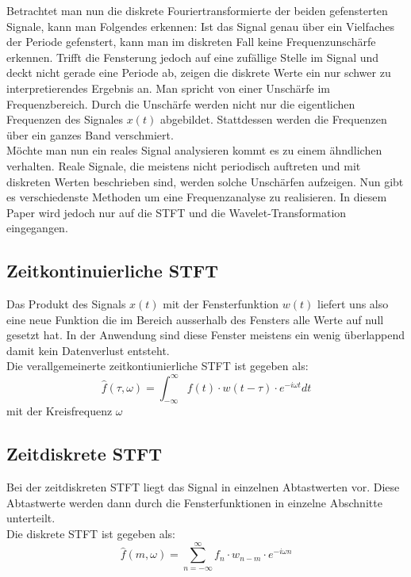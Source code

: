 Betrachtet man nun die diskrete Fouriertransformierte der beiden gefensterten Signale, kann man Folgendes erkennen: Ist das Signal genau über ein Vielfaches der Periode gefenstert, kann man im diskreten Fall keine Frequenzunschärfe erkennen. Trifft die Fensterung jedoch auf eine zufällige Stelle im Signal und deckt nicht gerade eine Periode ab, zeigen die diskrete Werte ein nur schwer zu interpretierendes Ergebnis an. Man spricht von einer Unschärfe im Frequenzbereich. Durch die Unschärfe werden nicht nur die eigentlichen Frequenzen des Signales $x(t)$ abgebildet. Stattdessen werden die Frequenzen über ein ganzes Band verschmiert.\\

Möchte man nun ein reales Signal analysieren kommt es zu einem ähndlichen verhalten. Reale Signale, die meistens nicht periodisch auftreten und mit diskreten Werten beschrieben sind, werden solche Unschärfen aufzeigen. Nun gibt es verschiedenste Methoden um eine Frequenzanalyse zu realisieren. In diesem Paper wird jedoch nur auf die STFT und die Wavelet-Transformation eingegangen. 


\subsection{Zeitkontinuierliche STFT}

Das Produkt des Signals $x(t)$ mit der Fensterfunktion $w(t) $ liefert uns also eine neue Funktion die im Bereich ausserhalb des Fensters alle Werte auf null gesetzt hat. In der Anwendung sind diese Fenster meistens ein wenig überlappend damit kein Datenverlust entsteht. \\
Die verallgemeinerte zeitkontiunierliche STFT ist  gegeben als:
\begin{equation}
	\hat{f}(\tau, \omega)=\int_{-\infty}^{\infty} f(t)\cdot w(t-\tau)\cdot e^{-i \omega t} dt
\end{equation}
mit der Kreisfrequenz  $\omega $

\subsection{Zeitdiskrete STFT}
Bei der zeitdiskreten STFT liegt das Signal in einzelnen Abtastwerten vor. Diese Abtastwerte werden dann durch die Fensterfunktionen in einzelne Abschnitte unterteilt. \\
Die diskrete STFT ist gegeben als:
\begin{equation}
	\hat{f}(m, \omega)=\sum_{n=-\infty}^{\infty} f_{n} \cdot w_{n-m}\cdot e^{-i \omega n}
\end{equation}


